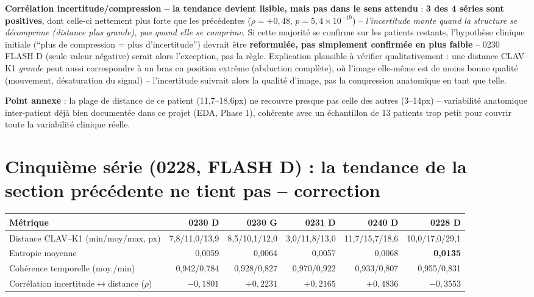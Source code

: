 \documentclass[11pt,a4paper]{report}
\begin{document}
\textbf{Corrélation incertitude/compression -- la tendance devient lisible, mais pas
dans le sens attendu} : \textbf{3 des 4 séries sont positives}, dont celle-ci
nettement plus forte que les précédentes ($\rho=+0{,}48$,
$p=5{,}4\times10^{-19}$) -- \emph{l'incertitude monte quand la structure se
décomprime (distance plus grande), pas quand elle se comprime}. Si cette majorité
se confirme sur les patients restants, l'hypothèse clinique initiale (``plus de
compression = plus d'incertitude'') devrait être \textbf{reformulée, pas
simplement confirmée en plus faible} -- 0230 FLASH D (seule valeur négative) serait
alors l'exception, pas la règle. Explication plausible à vérifier qualitativement :
une distance CLAV--K1 \emph{grande} peut aussi correspondre à un bras en position
extrême (abduction complète), où l'image elle-même est de moins bonne qualité
(mouvement, désaturation du signal) -- l'incertitude suivrait alors la qualité
d'image, pas la compression anatomique en tant que telle.

\textbf{Point annexe} : la plage de distance de ce patient (11,7--18,6px) ne
recouvre presque pas celle des autres (3--14px) -- variabilité anatomique
inter-patient déjà bien documentée dans ce projet (EDA, Phase 1), cohérente avec un
échantillon de 13 patients trop petit pour couvrir toute la variabilité clinique
réelle.

\section{Cinquième série (0228, FLASH D) : la tendance de la section précédente ne
tient pas -- correction}
\label{sec:phase3-synthese-5}

\begin{center}
\begin{tabular}{lrrrrr}
\toprule
Métrique & 0230 D & 0230 G & 0231 D & 0240 D & 0228 D \\
\midrule
Distance CLAV--K1 (min/moy/max, px) & 7,8/11,0/13,9 & 8,5/10,1/12,0 &
    3,0/11,8/13,0 & 11,7/15,7/18,6 & 10,0/17,0/29,1 \\
Entropie moyenne & 0,0059 & 0,0064 & 0,0057 & 0,0068 & \textbf{0,0135} \\
Cohérence temporelle (moy./min) & 0,942/0,784 & 0,928/0,827 & 0,970/0,922 &
    0,933/0,807 & 0,955/0,831 \\
Corrélation incertitude$\leftrightarrow$distance ($\rho$) & $-0{,}1801$ &
    $+0{,}2231$ & $+0{,}2165$ & $+0{,}4836$ & $-0{,}3553$ \\
\bottomrule
\end{tabular}
\end{center}
\end{document}
